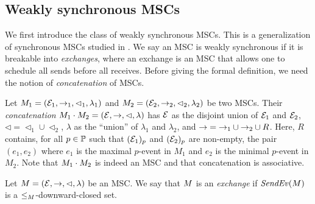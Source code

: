 
\subsection{Weakly synchronous MSCs}

We first introduce the class of weakly synchronous MSCs. This is a generalization of synchronous MSCs studied in \cite{DBLP:conf/cav/BouajjaniEJQ18, DBLP:conf/fossacs/GiustoLL20}. We say an MSC is weakly synchronous if it is breakable into \emph{exchanges}, where an exchange is an MSC that allows one to schedule all sends before all receives. Before giving the formal definition, we need the notion of \emph{concatenation} of MSCs.

Let $M_1 = (\mathcal{E}_1,\to_1,\lhd_1,\lambda_1)$ and
$M_2 = (\mathcal{E}_2,\to_2,\lhd_2,\lambda_2)$ be two MSCs.
Their \emph{concatenation} $M_1 \cdot M_2 = (\mathcal{E},\to,\lhd,\lambda)$ has $\mathcal{E}$ as the disjoint union of $\mathcal{E}_1$ and $\mathcal{E}_2$,
${\lhd}  = {\lhd_1} \cup {\lhd_2}$, $\lambda$ as the ``union'' of $\lambda_1$
and $\lambda_2$, and ${\to} = {\to_1} \cup {\to_2} \cup R$.
Here, $R$ contains, for all $p \in \mathbb{P}$ such that $(\mathcal{E}_1)_p$ and
$(\mathcal{E}_2)_p$ are non-empty, the pair $(e_1,e_2)$ where $e_1$ is the
maximal $p$-event in $M_1$ and $e_2$ is the minimal $p$-event in $M_2$.
Note that $M_1 \cdot M_2$ is indeed an MSC and that
concatenation is associative.

\begin{definition}[exchange]\label{def:weak-synchr}
Let $M = (\mathcal{E},\to,\lhd,\lambda)$ be an MSC.
We say that $M$ is an \emph{exchange} if
$\mathit{SendEv}(M)$ is
a ${\le_M}$-downward-closed set.
\end{definition}

